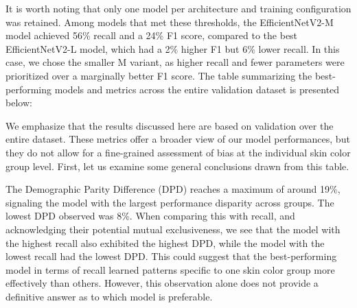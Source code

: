 It is worth noting that only one model per architecture and training configuration was retained. Among models that met these thresholds, the EfficientNetV2-M model achieved 56\% recall and a 24\% F1 score, compared to the best EfficientNetV2-L model, which had a 2\% higher F1 but 6\% lower recall. In this case, we chose the smaller M variant, as higher recall and fewer parameters were prioritized over a marginally better F1 score.
The table summarizing the best-performing models and metrics across the entire validation dataset is presented below:


\begin{table}[H]
\centering
\caption{Comparison of selected experiments across fairness and classification metrics.}
\label{tab:fairness-metrics}
\end{table}

We emphasize that the results discussed here are based on validation over the entire dataset. These metrics offer a broader view of our model performances, but they do not allow for a fine-grained assessment of bias at the individual skin color group level. First, let us examine some general conclusions drawn from this table.

The Demographic Parity Difference (DPD) reaches a maximum of around 19\%, signaling the model with the largest performance disparity across groups. The lowest DPD observed was 8\%. When comparing this with recall, and acknowledging their potential mutual exclusiveness, we see that the model with the highest recall also exhibited the highest DPD, while the model with the lowest recall had the lowest DPD. This could suggest that the best-performing model in terms of recall learned patterns specific to one skin color group more effectively than others. However, this observation alone does not provide a definitive answer as to which model is preferable.

